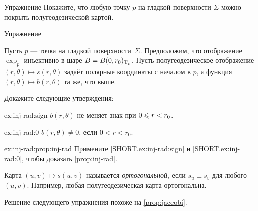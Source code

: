 \begin{thm}{Упражнение}\label{ex:semigeodesc-chart}
Покажите, что любую точку $p$ на гладкой поверхности $\Sigma$ можно покрыть полугеодезической картой.
\end{thm}

\begin{thm}{Упражнение}\label{ex:inj-rad}
{\sloppy
Пусть $p$ --- точка на гладкой поверхности~$\Sigma$.
Предположим, что отображение $\exp_p$ инъективно в шаре $B=B(0,r_0)_{\mathrm{T}_p}$.
Пусть полугеодезическое отображение $(r,\theta)\mapsto s(r,\theta)$ задаёт полярные координаты с началом в $p$, а функция $(r,\theta)\mapsto b(r,\theta)$ та же, что выше.

}

Докажите следующие утверждения:

\begin{subthm}{ex:inj-rad:sign}
$b(r,\theta)$ не меняет знак при $0\z\le r\z<r_0$.
\end{subthm}

\begin{subthm}{ex:inj-rad:0}
$b(r,\theta)\ne0$, если $0< r<r_0$.
\end{subthm}

\begin{subthm}{ex:inj-rad:prop:inj-rad}
Примените \ref{SHORT.ex:inj-rad:sign} и \ref{SHORT.ex:inj-rad:0}, чтобы доказать \ref{prop:inj-rad}.
\end{subthm}
 
\end{thm}


Карта $(u,v)\mapsto s(u,v)$ называется \emph{ортогональной}, если $s_u\perp s_v$ для любого $(u,v)$.
Например, любая полугеодезическая карта ортогональна.

Решение следующего упражнения похоже на \ref{prop:jaccobi}.

